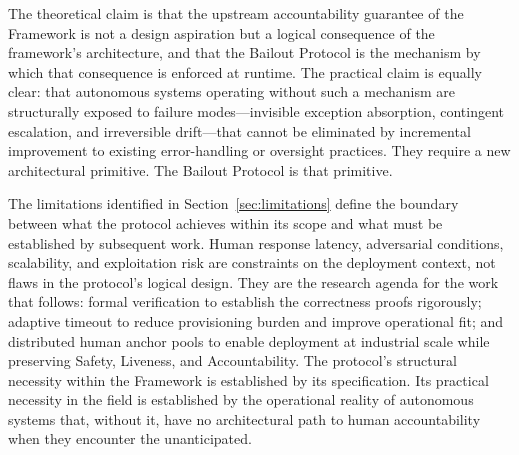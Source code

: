 The theoretical claim is that the upstream accountability guarantee of the \bxthree{} Framework is not a design aspiration but a logical consequence of the framework's architecture, and that the Bailout Protocol is the mechanism by which that consequence is enforced at runtime. The practical claim is equally clear: that autonomous systems operating without such a mechanism are structurally exposed to failure modes---invisible exception absorption, contingent escalation, and irreversible drift---that cannot be eliminated by incremental improvement to existing error-handling or oversight practices. They require a new architectural primitive. The Bailout Protocol is that primitive.

The limitations identified in Section~\ref{sec:limitations} define the boundary between what the protocol achieves within its scope and what must be established by subsequent work. Human response latency, adversarial conditions, scalability, and exploitation risk are constraints on the deployment context, not flaws in the protocol's logical design. They are the research agenda for the work that follows: formal verification to establish the correctness proofs rigorously; adaptive timeout to reduce provisioning burden and improve operational fit; and distributed human anchor pools to enable deployment at industrial scale while preserving Safety, Liveness, and Accountability. The protocol's structural necessity within the \bxthree{} Framework is established by its specification. Its practical necessity in the field is established by the operational reality of autonomous systems that, without it, have no architectural path to human accountability when they encounter the unanticipated.
